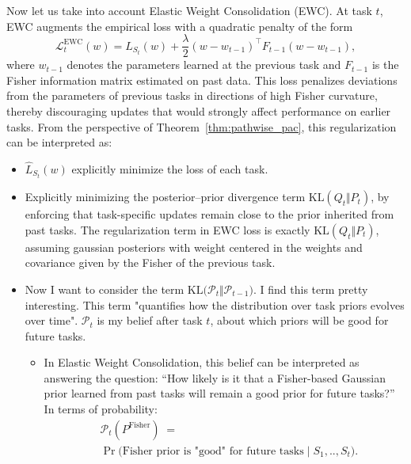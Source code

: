 \documentclass{article}
\theoremstyle{plain}
\theoremstyle{definition}
\theoremstyle{remark}
\begin{document}
Now let us take into account Elastic Weight Consolidation (EWC). At task $t$, EWC augments the empirical loss with a quadratic penalty of the form
\[
\mathcal L_t^{\mathrm{EWC}}(w)
=
\hat L_{S_t}(w)
+
\frac{\lambda}{2}
(w - w_{t-1})^\top F_{t-1} (w - w_{t-1}),
\]
where $w_{t-1}$ denotes the parameters learned at the previous task and $F_{t-1}$ is the Fisher information matrix estimated on past data.  
This loss penalizes deviations from the parameters of previous tasks in directions of high Fisher curvature, thereby discouraging updates that would strongly affect performance on earlier tasks. From the perspective of Theorem~\ref{thm:pathwise_pac}, this regularization can be interpreted as:
\begin{itemize}
\item $\hat L_{S_t}(w)$ explicitly minimize the loss of each task.
    \item Explicitly minimizing the posterior--prior divergence term $\mathrm{KL}(Q_t \Vert P_t)$, by enforcing that task-specific updates remain close to the prior inherited from past tasks. The regularization term in EWC loss is exactly $\mathrm{KL}(Q_t \Vert P_t)$, assuming gaussian posteriors with weight centered in the weights and covariance given by the Fisher of the previous task.
    \item Now I want to consider the term $\mathrm{KL}\bigl(\mathcal P_t\Vert\mathcal P_{t-1}\bigr)$. I find this term pretty interesting. This term "quantifies how the distribution over task priors evolves over time".  $\mathcal{P}_t$ is my belief after task $t$, about which priors will be good for future tasks.
    \begin{itemize}
        \item    In Elastic Weight Consolidation, this belief can be interpreted as answering the question: “How likely is it that a Fisher-based Gaussian prior learned from past tasks will remain a good prior for future tasks?”  In terms of probability:
    \begin{align*}
    &\mathcal P_t\!\left(P^{\mathrm{Fisher}}\right)
    \;=\;\\
    &\Pr\!\big(\text{Fisher prior is "good" for future tasks}
    \;\big|\; S_1,..,S_t\big).
    \end{align*}


\end{itemize}
\end{itemize}
\end{document}
